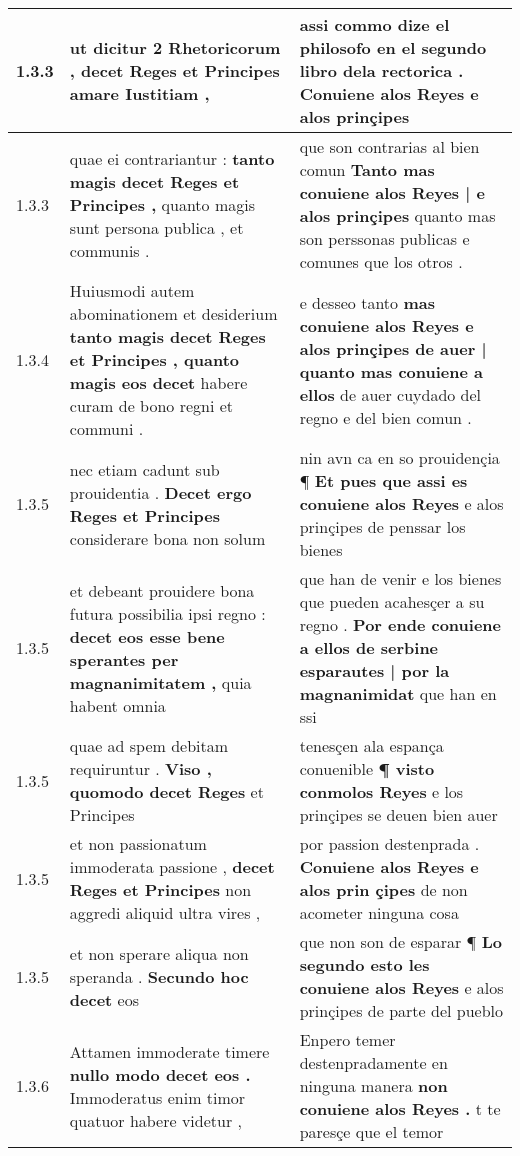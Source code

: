 \begin{tabular}{|p{1cm}|p{6.5cm}|p{6.5cm}|}
1.3.3 & ut dicitur 2 Rhetoricorum , \textbf{ decet Reges } et Principes amare Iustitiam , & assi commo dize el philosofo en el segundo libro dela rectorica . \textbf{ Conuiene alos Reyes } e alos prinçipes \\\hline
1.3.3 & quae ei contrariantur : \textbf{ tanto magis decet Reges et Principes , } quanto magis sunt persona publica , et communis . & que son contrarias al bien comun \textbf{ Tanto mas conuiene alos Reyes | e alos prinçipes } quanto mas son perssonas publicas e comunes que los otros . \\\hline
1.3.4 & Huiusmodi autem abominationem et desiderium \textbf{ tanto magis decet Reges et Principes , quanto magis eos decet } habere curam de bono regni et communi . & e desseo tanto \textbf{ mas conuiene alos Reyes e alos prinçipes de auer | quanto mas conuiene a ellos } de auer cuydado del regno e del bien comun . \\\hline
1.3.5 & nec etiam cadunt sub prouidentia . \textbf{ Decet ergo Reges et Principes } considerare bona non solum & nin avn ca en so prouidençia ¶ \textbf{ Et pues que assi es conuiene alos Reyes } e alos prinçipes de penssar los bienes \\\hline
1.3.5 & et debeant prouidere bona futura possibilia ipsi regno : \textbf{ decet eos esse bene sperantes per magnanimitatem , } quia habent omnia & que han de venir e los bienes que pueden acahesçer a su regno . \textbf{ Por ende conuiene a ellos de serbine esparautes | por la magnanimidat } que han en ssi \\\hline
1.3.5 & quae ad spem debitam requiruntur . \textbf{ Viso , quomodo decet Reges } et Principes & tenesçen ala espança conuenible \textbf{ ¶ visto conmolos Reyes } e los prinçipes se deuen bien auer \\\hline
1.3.5 & et non passionatum immoderata passione , \textbf{ decet Reges et Principes } non aggredi aliquid ultra vires , & por passion destenprada . \textbf{ Conuiene alos Reyes e alos prin çipes } de non acometer ninguna cosa \\\hline
1.3.5 & et non sperare aliqua non speranda . \textbf{ Secundo hoc decet } eos & que non son de esparar ¶ \textbf{ Lo segundo esto les conuiene alos Reyes } e alos prinçipes de parte del pueblo \\\hline
1.3.6 & Attamen immoderate timere \textbf{ nullo modo decet eos . } Immoderatus enim timor quatuor habere videtur , & Enpero temer destenpradamente en ninguna manera \textbf{ non conuiene alos Reyes . } t te paresçe que el temor \\\hline

\end{tabular}
